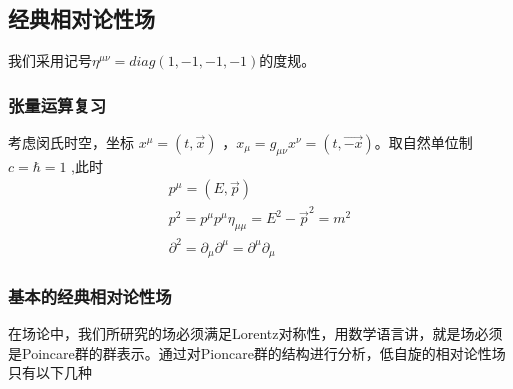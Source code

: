 \subsection{经典相对论性场}

我们采用记号$\eta^{\mu\nu}=diag(1,-1,-1,-1)$的度规。

\subsubsection{张量运算复习}

考虑闵氏时空，坐标 $x^{\mu}=(t,\vec{x})$ ，$x_{\mu}=g_{\mu\nu}x^{\nu}=(t,\vec{-x})$。取自然单位制 $c=\hbar=1$ ,此时
\begin{equation}
   \begin{array}{lr}
     p^{\mu}=(E,\vec{p})\\
     p^{2}=p^{\mu}p^{\mu}\eta_{\mu\mu}=E^{2}-\vec{p}^{2}=m^{2}\\
     \partial^{2}=\partial_{\mu}\partial^{\mu}=\partial^{\mu}\partial_{\mu}
   \end{array}
\end{equation}

\subsubsection{基本的经典相对论性场}

在场论中，我们所研究的场必须满足Lorentz对称性，用数学语言讲，就是场必须是Poincare群的群表示。通过对Pioncare群的结构进行分析，低自旋的相对论性场只有以下几种

